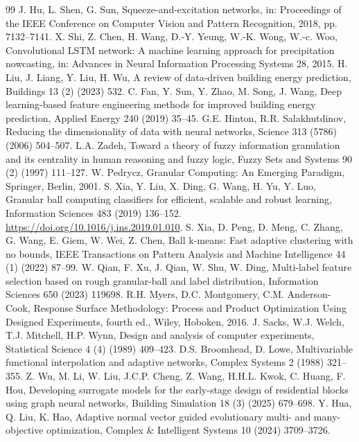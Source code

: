 \documentclass[11pt]{article}
\begin{document}
\begin{thebibliography}{99}
 J. Hu, L. Shen, G. Sun, Squeeze-and-excitation networks, in: Proceedings of the IEEE Conference on Computer Vision and Pattern Recognition, 2018, pp. 7132--7141.
 X. Shi, Z. Chen, H. Wang, D.-Y. Yeung, W.-K. Wong, W.-c. Woo, Convolutional LSTM network: A machine learning approach for precipitation nowcasting, in: Advances in Neural Information Processing Systems 28, 2015.
 H. Liu, J. Liang, Y. Liu, H. Wu, A review of data-driven building energy prediction, Buildings 13 (2) (2023) 532.
 C. Fan, Y. Sun, Y. Zhao, M. Song, J. Wang, Deep learning-based feature engineering methods for improved building energy prediction, Applied Energy 240 (2019) 35--45.
 G.E. Hinton, R.R. Salakhutdinov, Reducing the dimensionality of data with neural networks, Science 313 (5786) (2006) 504--507.
 L.A. Zadeh, Toward a theory of fuzzy information granulation and its centrality in human reasoning and fuzzy logic, Fuzzy Sets and Systems 90 (2) (1997) 111--127.
 W. Pedrycz, Granular Computing: An Emerging Paradigm, Springer, Berlin, 2001.
 S. Xia, Y. Liu, X. Ding, G. Wang, H. Yu, Y. Luo, Granular ball computing classifiers for efficient, scalable and robust learning, Information Sciences 483 (2019) 136--152. \url{https://doi.org/10.1016/j.ins.2019.01.010}.
 S. Xia, D. Peng, D. Meng, C. Zhang, G. Wang, E. Giem, W. Wei, Z. Chen, Ball k-means: Fast adaptive clustering with no bounds, IEEE Transactions on Pattern Analysis and Machine Intelligence 44 (1) (2022) 87--99.
 W. Qian, F. Xu, J. Qian, W. Shu, W. Ding, Multi-label feature selection based on rough granular-ball and label distribution, Information Sciences 650 (2023) 119698.
 R.H. Myers, D.C. Montgomery, C.M. Anderson-Cook, Response Surface Methodology: Process and Product Optimization Using Designed Experiments, fourth ed., Wiley, Hoboken, 2016.
 J. Sacks, W.J. Welch, T.J. Mitchell, H.P. Wynn, Design and analysis of computer experiments, Statistical Science 4 (4) (1989) 409--423.
 D.S. Broomhead, D. Lowe, Multivariable functional interpolation and adaptive networks, Complex Systems 2 (1988) 321--355.
 Z. Wu, M. Li, W. Liu, J.C.P. Cheng, Z. Wang, H.H.L. Kwok, C. Huang, F. Hou, Developing surrogate models for the early-stage design of residential blocks using graph neural networks, Building Simulation 18 (3) (2025) 679--698.
 Y. Hua, Q. Liu, K. Hao, Adaptive normal vector guided evolutionary multi- and many-objective optimization, Complex \& Intelligent Systems 10 (2024) 3709--3726.

\end{thebibliography}
\end{document}
